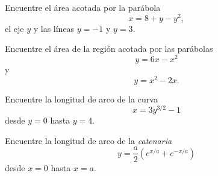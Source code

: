 
	\begin{problema} %
		Encuentre el área acotada por la parábola \[ x=8+y-y^2 , \] el eje $ y $ y las líneas $ y=-1 $ y $ y=3. $
	\end{problema}



	\begin{problema}
		
		Encuentre el área de la región acotada por las parábolas \[ y= 6x-x^2 \] y \[ y=x^2-2x. \]
	\end{problema}



	\begin{problema}
		Encuentre la longitud de arco de la curva \[ x=3y^{3/2}-1 \] desde $ y=0 $ hasta $ y=4 .$
	\end{problema}



	\begin{problema}
		Encuentre la longitud de arco de la \emph{catenaria} \[ y=\dfrac{a}{2}\left(e^{x/a} + e^{-x/a}\right) \] desde $ x=0 $ hasta $ x=a $.
	\end{problema}
